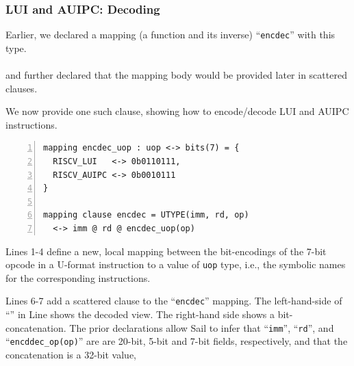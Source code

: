 \documentclass[aspectratio=169]{beamer}
\newcommand{\hmm}{\hspace*{2em}}
\newcommand{\slidefont}{\scriptsize}
\newcommand{\cf}{\scriptsize\tt}
\begin{document}

\begin{frame}[fragile]
  \frametitle{LUI and AUIPC: Decoding}

  \slidefont

  Earlier, we declared a mapping (a function and its inverse) ``{\cf encdec}'' with this type. \\
  \hmm {\tt val encdec : ast <-> bits(32)} \\
  and further declared that the mapping body would be provided later in scattered clauses.

  \vspace{1ex}
    
  We now provide one such clause, showing how to encode/decode LUI and AUIPC instructions.

  \vspace{1ex}

  \begin{Verbatim}[frame=single, numbers=left, label = File riscv\_insts\_base.sail]
mapping encdec_uop : uop <-> bits(7) = {
  RISCV_LUI   <-> 0b0110111,
  RISCV_AUIPC <-> 0b0010111
}

mapping clause encdec = UTYPE(imm, rd, op)
  <-> imm @ rd @ encdec_uop(op)
  \end{Verbatim}

  \begin{minipage}{\textwidth}
    Lines 1-4 define a new, local mapping between the bit-encodings of the 7-bit
    opcode in a U-format instruction to a value of {\cf uop} type,
    i.e., the symbolic names for the corresponding instructions.

    \vspace{1ex}

    Lines 6-7 add a scattered clause to the ``{\cf encdec}'' mapping.
    The left-hand-side of ``{\cf <->}'' in Line shows the decoded
    view.  The right-hand side shows a bit-concatenation.  The prior
    declarations allow Sail to infer that ``{\cf imm}'', ``{\cf rd}'',
    and ``{\cf encddec\_op(op)}'' are are 20-bit, 5-bit and 7-bit
    fields, respectively, and that the concatenation is a 32-bit
    value,

  \end{minipage}

\end{frame}

\end{document}
